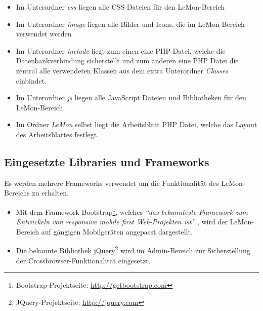 \begin{singlespacing}
	\begin{itemize}
		\item Im Unterordner \emph{css} liegen alle CSS Dateien für den \gls{LeMon}-Bereich
		\item Im Unterordner \emph{image} liegen alle Bilder und Icons, die im
			\gls{LeMon}-Bereich verwendet werden
		\item Im Unterordner \emph{include} liegt zum einen eine PHP Datei, welche die
			Datenbankverbindung sicherstellt und zum anderen eine PHP Datei die zentral alle
			verwendeten Klassen aus dem extra Unterordner \emph{Classes} einbindet.
		\item Im Unterordner \emph{js} liegen alle \gls{JavaScript} Dateien und Bibliotheken für den
			\gls{LeMon}-Bereich
		\item Im Ordner \emph{LeMon} selbst liegt die Arbeitsblatt \gls{PHP} Datei, welche das Layout des Arbeitsblattes festlegt.
	\end{itemize}
\end{singlespacing}


\subsection{Eingesetzte Libraries und Frameworks}
Es werden mehrere Frameworks verwendet um die Funktionalität des LeMon-Bereichs
zu erhalten.
\begin{singlespacing}
	\begin{itemize}
		\item Mit dem Framework \gls{Bootstrap}\footnote{Bootstrap-Projektseite:
			\url{http://getbootstrap.com}}, welches \emph{"`das bekannteste Framework zum Entwickeln
			von responsive mobile first Web-Projekten ist"'} \cite{BootstrapDefinition}, wird
			der LeMon-Bereich auf gängigen Mobilgeräten angepasst dargestellt.
		\item Die bekannte Bibliothek \gls{jQuery}\footnote{JQuery-Projektseite:
			\url{http://jquery.com}} wird im Admin-Bereich zur Sicherstellung der
			Crossbrowser-Funktionalität eingesetzt.
	\end{itemize}
\end{singlespacing}

